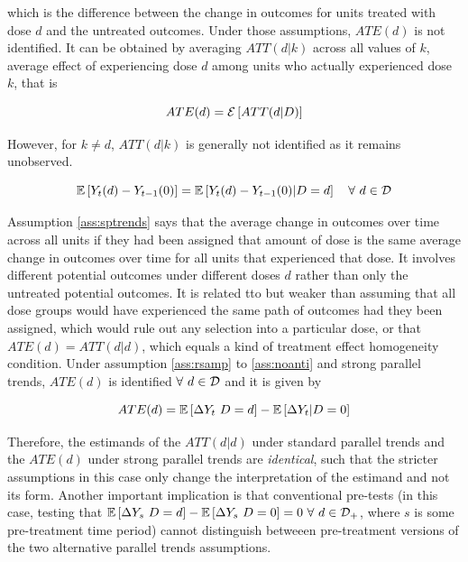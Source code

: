\documentclass[11pt]{article}
\begin{document}
which is the difference between the change in outcomes for units treated with dose $d$ and the untreated outcomes. Under those assumptions, $ATE(d)$ is not identified. It can be obtained by averaging $ATT(d|k)$ across all values of $k$, average effect of experiencing dose $d$ among units who actually experienced dose $k$, that is

\begin{equation}
    ATE(d) = \mathcal{E}\left[ ATT(d|D) \right]
\end{equation}

However, for $k \neq d$, $ATT(d|k)$ is generally not identified as it remains unobserved.

\begin{assumption}\label{ass:sptrends}
    \begin{equation}
        \mathbb{E}\left[ Y_{t} (d) - Y_{t-1} (0) \right] = \mathbb{E}\left[ Y_{t} (d) - Y_{t-1} (0) | D = d \right] \quad \forall \ d \in \mathcal{D}
    \end{equation}
\end{assumption}

Assumption \ref{ass:sptrends} says that the average change in outcomes over time across all units if they had been assigned that amount of dose is the same average change in outcomes over time for all units that experienced that dose. It involves different potential outcomes under different doses $d$ rather than only the untreated potential outcomes. It is related tto but weaker than assuming that all dose groups would have experienced the same path of outcomes had they been assigned, which would rule out any selection into a particular dose, or that $ATE(d) = ATT(d|d)$, which equals a kind of treatment effect homogeneity condition. Under assumption \ref{ass:rsamp} to \ref{ass:noanti} and strong parallel trends, $ATE(d)$ is identified $\forall \ d \in \mathcal{D}$ and it is given by

\begin{equation}
    ATE(d) = \mathbb{E}\left[ \Delta Y_{t} \ D = d \right] - \mathbb{E}\left[ \Delta Y_{t} | D = 0 \right]
\end{equation}

Therefore, the estimands of the $ATT(d|d)$ under standard parallel trends and the $ATE(d)$ under strong parallel trends are \textit{identical}, such that the stricter assumptions in this case only change the interpretation of the estimand and not its form. Another important implication is that conventional pre-tests (in this case, testing that $\mathbb{E}\left[ \Delta Y_{s} \ D = d \right] - \mathbb{E}\left[ \Delta Y_{s} \ D = 0 \right] = 0 \ \forall \ d \in \mathcal{D}_{+}$, where $s$ is some pre-treatment time period) cannot distinguish betweeen pre-treatment versions of the two alternative parallel trends assumptions.
\end{document}
